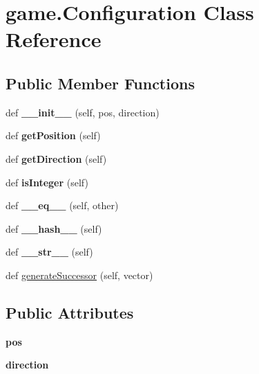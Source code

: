 \hypertarget{classgame_1_1_configuration}{}\section{game.\+Configuration Class Reference}
\label{classgame_1_1_configuration}
\subsection*{Public Member Functions}
\begin{DoxyCompactItemize}
\item 
\mbox{\label{classgame_1_1_configuration_a09f875cab5e96bc903e5390b6742eb03}} 
def {\bfseries \+\_\+\+\_\+init\+\_\+\+\_\+} (self, pos, direction)
\item 
\mbox{\label{classgame_1_1_configuration_a2b56d29c113daa2c2f6684a777192dff}} 
def {\bfseries get\+Position} (self)
\item 
\mbox{\label{classgame_1_1_configuration_a3e510d8e5104e13681f2c5f066a86b71}} 
def {\bfseries get\+Direction} (self)
\item 
\mbox{\label{classgame_1_1_configuration_ac3e5734175aaf38e7e766c29d99a7997}} 
def {\bfseries is\+Integer} (self)
\item 
\mbox{\label{classgame_1_1_configuration_afda2e6acf77361ede5b64b76097db7c4}} 
def {\bfseries \+\_\+\+\_\+eq\+\_\+\+\_\+} (self, other)
\item 
\mbox{\label{classgame_1_1_configuration_a093f183229637e1de2cd36dfa3ca6968}} 
def {\bfseries \+\_\+\+\_\+hash\+\_\+\+\_\+} (self)
\item 
\mbox{\label{classgame_1_1_configuration_a900303f94f3f07e67f80df913282dd7a}} 
def {\bfseries \+\_\+\+\_\+str\+\_\+\+\_\+} (self)
\item 
def \hyperlink{classgame_1_1_configuration_a282e5131bfdb055bdddde8df6d881c02}{generate\+Successor} (self, vector)
\end{DoxyCompactItemize}
\subsection*{Public Attributes}
\begin{DoxyCompactItemize}
\item 
\mbox{\label{classgame_1_1_configuration_a152722015a1e6841fd840c7143285dfe}} 
{\bfseries pos}
\item 
\mbox{\label{classgame_1_1_configuration_a9e623b37d8b98a775937b1f65fedf783}} 
{\bfseries direction}
\end{DoxyCompactItemize}


